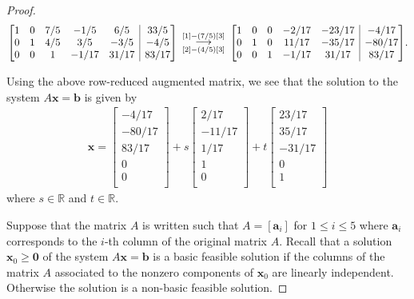 \documentclass[12pt]{article}
\makeatletter
\theoremstyle{definition}
\newcommand{\vect}[1]{\boldsymbol{#1}}
\newenvironment{amatrix}[1]{%
  \left[\begin{array}{@{}*{#1}{c}|c@{}}
}{%
  \end{array}\right]
}
\newcommand{\grstep}[2][\relax]{%
   \ensuremath{\mathrel{
       {\mathop{\longrightarrow}\limits^{#2\mathstrut}_{
                                     \begin{subarray}{l} #1 \end{subarray}}}}}}
\makeatother
\begin{document}
\begin{proof}
\begin{align*}
\begin{amatrix}{5}
      1 & 0 & 7/5 & -1/5 & 6/5 & 33/5 \\
      0 & 1 & 4/5 & 3/5 & -3/5 & -4/5 \\
      0 & 0 & 1 & -1/17 & 31/17 & 83/17 \\
    \end{amatrix}
    \begin{array}{c}
      \grstep[{[2] - (4/5)[3]}]{[1] - (7/5)[3]} \\
    \end{array}
    \begin{amatrix}{5}
      1 & 0 & 0 & -2/17 & -23/17 & -4/17 \\
      0 & 1 & 0 & 11/17 & -35/17 & -80/17 \\
      0 & 0 & 1 & -1/17 & 31/17 & 83/17 \\
    \end{amatrix}.
  \end{align*}

  Using the above row-reduced augmented matrix, we see that the solution to the
  system $A\vect{x} = \vect{b}$ is given by
  \begin{align}\label{prob_2_x}
    \vect{x} =
    \begin{bmatrix}
      -4/17 \\
      -80/17 \\
      83/17 \\
      0 \\
      0 \\
    \end{bmatrix}
    +
    s
    \begin{bmatrix}
      2/17 \\
      -11/17 \\
      1/17 \\
      1 \\
      0 \\
    \end{bmatrix}
    +
    t
    \begin{bmatrix}
      23/17 \\
      35/17 \\
      -31/17 \\
      0 \\
      1 \\
    \end{bmatrix}
  \end{align}
  where $s\in\mathbb{R}$ and $t\in\mathbb{R}$.

  Suppose that the matrix $A$ is written such that $A = [\vect{a}_i]$ for
  $1 \leq i \leq 5$ where $\vect{a}_i$ corresponds to the $i$-th column of the original
  matrix $A$. Recall that a solution $\vect{x}_0 \geq \vect{0}$ of the system $A\vect{x} = \vect{b}$ is a
  basic feasible solution if the columns of the matrix
  $A$ associated to the nonzero components of $\vect{x}_0$ are linearly
  independent. Otherwise the solution is a non-basic feasible solution.


\end{proof}
\end{document}
